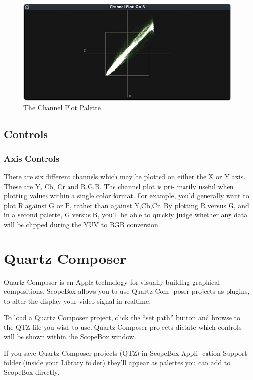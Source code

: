 \documentclass[10,letterpaper,]{report}
\begin{document}
\begin{figure}[htbp]
\centering
\includegraphics{images/ChannelPlot.png}
\caption{The Channel Plot Palette}
\end{figure}

\section{Controls}

\subsection{Axis Controls}

There are six different channels which may be plotted on either the X or
Y axis. These are Y, Cb, Cr and R,G,B. The channel plot is pri- marily
useful when plotting values within a single color format. For example,
you'd generally want to plot R against G or B, rather than against
Y,Cb,Cr. By plotting R versus G, and in a second palette, G versus B,
you'll be able to quickly judge whether any data will be clipped during
the YUV to RGB conversion.

\chapter{Quartz Composer}

Quartz Composer is an Apple technology for visually building graphical
compositions. ScopeBox allows you to use Quartz Com- poser projects as
plugins, to alter the display your video signal in realtime.

To load a Quartz Composer project, click the ``set path'' button and
browse to the QTZ file you wish to use. Quartz Composer projects dictate
which controls will be shown within the ScopeBox window.

If you save Quartz Composer projects (QTZ) in ScopeBox Appli- cation
Support folder (inside your Library folder) they'll appear as palettes
you can add to ScopeBox directly.
\end{document}
